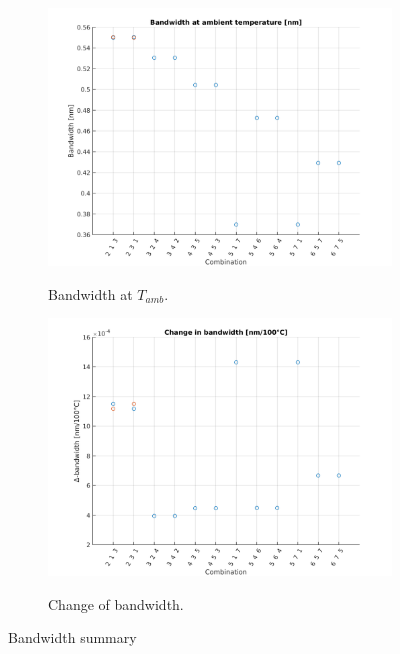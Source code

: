 \documentclass[12pt,a4paper,twoside]{article}
\begin{document}
\begin{figure}[h!]
	\centering
	\begin{subfigure}[b]{0.75\textwidth}
		\includegraphics[width=1\textwidth]{baat2.png}
		\label{fig_sym_b@t2} %
		\caption{Bandwidth at $T_{amb}$.}
	\end{subfigure}
	\begin{subfigure}[b]{0.75\textwidth}
		\includegraphics[width=1\textwidth]{bc2.png}
		\label{fig_sym_bc2} %
		\caption{Change of bandwidth.}
	\end{subfigure}
	\caption{Bandwidth summary}
	\label{fig_sym_bw}
\end{figure}
\end{document}
